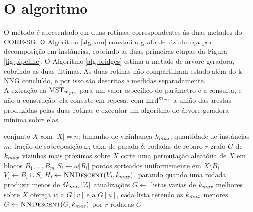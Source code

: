 \section{O algoritmo\label{sec:algorithm}}

O método é apresentado em duas rotinas, correspondentes às duas metades do \ac{CORE-SG}. O Algoritmo \ref{alg:knn} constrói o grafo de vizinhança por decomposição em instâncias, cobrindo as duas primeiras etapas da Figura \ref{fig:pipeline}. O Algoritmo \ref{alg:bridges} estima a metade de árvore geradora, cobrindo as duas últimas. As duas rotinas não compartilham estado além do \ac{k-NNG} concluído, e por isso são descritas e medidas separadamente.\\

A extração da $\mathrm{MST}_{m_{pts}}$ para um valor específico do parâmetro é a consulta, e não a construção: ela consiste em repesar com $\mathrm{mrd}^{m_{pts}}$ a união das arestas produzidas pelas duas rotinas e executar um algoritmo de árvore geradora mínima sobre elas.\\

\begin{algorithm}[htb!]
\caption{\label{alg:knn} O grafo de vizinhança, a partir de instâncias independentes}
\begin{algorithmic}[1]
\REQUIRE conjunto $X$ com $|X| = n$; tamanho de vizinhança $k_{max}$; quantidade de instâncias $m$; fração de sobreposição $\omega$; taxa de parada $\delta$; rodadas de reparo $r$
\ENSURE grafo $G$ de $k_{max}$ vizinhos mais próximos sobre $X$
\STATE corte uma permutação aleatória de $X$ em blocos $B_1, \dots, B_m$
    \STATE $S_i \leftarrow \omega|B_i|$ pontos sorteados uniformemente em $X \setminus B_i$
    \STATE $V_i \leftarrow B_i \cup S_i$
    \STATE $H_i \leftarrow \textsc{NNDescent}(V_i, k_{max})$, parando quando uma rodada produzir menos de $\delta k_{max}|V_i|$ atualizações
\ENDFOR
\STATE $G \leftarrow$ listas vazias de $k_{max}$ melhores sobre $X$
        \STATE ofereça $w$ a $G[v]$ e a $G[u]$, cada lista retendo os $k_{max}$ menores
    \ENDFOR
\ENDFOR
{}
    \STATE $G \leftarrow \textsc{NNDescent}(G, k_{max})$ por $r$ rodadas
\ENDIF
\RETURN $G$
\end{algorithmic}
\end{algorithm}

